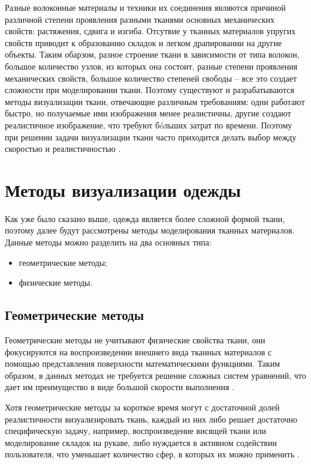 Разные волоконные материалы и техники их соединения являются причиной
различной степени проявления разными тканями основных механических свойств:
растяжения, сдвига и изгиба. Отсутвие у тканных материалов упругих
свойств приводит к образованию складок и легком драпировании на другие
объекты. Таким обарзом, разное строение ткани в зависимости от типа волокон,
большое количество узлов, из которых она состоит, разные
степени проявления механических свойств, большое количество степеней свободы -- все это
создает сложности при моделировании ткани. Поэтому существуют и разрабатываются
методы визуализации ткани, отвечающие различным требованиям: одни работают
быстро, но получаемые ими изображения менее реалистичны, другие создают
реалистичное изображение, что требуют бóльших затрат по времени. Поэтому
при решении задачи визуализации ткани часто приходится делать выбор
между скоростью и реалистичностью \cite{bib11}.

\section{Методы визуализации одежды}

Как уже было сказано выше, одежда является более сложной формой ткани,
поэтому далее будут рассмотрены методы моделирования тканных материалов.
Данные методы можно разделить на два основных типа:
\begin{itemize}[left=\parindent]
    \item геометрические методы;
    \item физические методы.
\end{itemize}

\subsection{Геометрические методы}

Геометрические методы не учитывают физические свойства ткани, они фокусируются
на воспроизведении внешнего вида тканных материалов с помощью представления
поверхности математическими функциями. Таким образом, в данных методах не
требуется решение сложных систем уравнений, что дает им преимущество в виде
большой скорости выполнения \cite{bib07}.

Хотя геометрические методы за короткое время могут с достаточной долей
реалистичности визуализировать ткань, каждый из них либо решает достаточно
специфическую задачу, например, воспроизведение висящей ткани или моделирование
складок на рукаве, либо нуждается в активном содействии пользователя, что
уменьшает количество сфер, в которых их можно применить \cite{bib07}.

